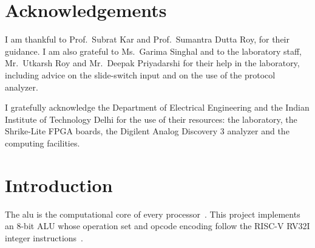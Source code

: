\documentclass[12pt,a4paper,twoside]{article}
\begin{document}
\clearpage
\section*{Acknowledgements}
\thispagestyle{plain}

I am thankful to Prof.\ Subrat Kar and Prof.\ Sumantra Dutta Roy, for their guidance. I am also grateful to Ms.\ Garima Singhal and to the laboratory staff, Mr.\ Utkarsh Roy and Mr.\ Deepak Priyadarshi for their help in the laboratory,
including advice on the slide-switch input and on the use of the protocol analyzer.


I gratefully acknowledge the Department of Electrical Engineering and the Indian
Institute of Technology Delhi for the use of their resources: the laboratory, the
Shrike-Lite FPGA boards, the Digilent Analog Discovery 3 analyzer and the computing
facilities.

\clearpage
\begin{abstract}
\noindent This report presents an 8-bit arithmetic logic unit (ALU) implementing the
ten integer operations of the RISC-V RV32I base instruction set (ADD, SUB, AND, OR,
XOR, SLL, SRL, SRA, SLT and SLTU), designed in Verilog and implemented on the
Vicharak Shrike-Lite board, which combines a Renesas ForgeFPGA (SLG47910V) with an
RP2040 microcontroller. Because the FPGA exposes only 14 user pins, the operands
and opcode are delivered by the RP2040 as a 24-bit SPI-style serial frame, and the
8-bit result and status flags are observed on a protocol analyzer (Digilent Analog
Discovery 3 with WaveForms). Two implementations were built: a \emph{regular} ALU
with one module per operation, and a \emph{resource-shared} ALU that realises all
ten operations with a single adder and a single shifter. Both designs were verified
on hardware against a reference model and produced identical results for every test
case, while the shared design uses 26 fewer LUTs (16.8\% of the complete design).
\end{abstract}

\clearpage
\tableofcontents
\clearpage
\listoffigures
\listoftables


\clearpage
{}
\section{Introduction}

The \gls{alu} is the computational core of every
processor~\cite{patterson, harris}. This project implements an 8-bit ALU whose
operation set and opcode encoding follow the RISC-V RV32I integer
instructions~\cite{riscv}.
\end{document}

